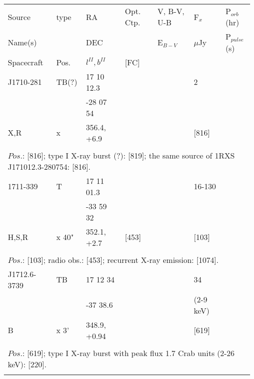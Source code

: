 \documentclass{aa}
\begin{document}
\begin{tabular}{p{2.5cm}p{1cm}p{1.8cm}p{2.3cm}p{3.3cm}p{2.0cm}p{2.2cm}}
\noalign{\smallskip}
\multicolumn{7}{p{17.5cm}}{Table 1.  (continued) }\\        
\hline
\noalign{\smallskip}
Source         & type  & RA                       &  Opt. Ctp. & V, B-V, U-B  & F$_{x}$          & P$_{orb}$(hr)    \\
Name(s)       &            & DEC                    &                     & E$_{B-V}$   & $\mu$Jy        & P$_{pulse}$(s) \\
Spacecraft & Pos.  & $l^{II}, b^{II}$      &  [FC]           &                        &                         &                             \\
\noalign{\smallskip} 
\hline

\noalign{\smallskip}
J1710-281       & TB(?)   & 17 10 12.3      &                     &                     & 2              &      \\
                          &               & -28 07 54        &                     &                     &                 &    \\
X,R                   & x            & 356.4, +6.9      &                     &                    & [816]       &    \\
\\
\multicolumn{7}{p{17.5cm}}{
$Pos$.: [816]; type I X-ray burst (?): [819]; the same source of 1RXS J171012.3-280754: [816].}\\
\noalign{\smallskip}
\hline

\noalign{\smallskip}
1711-339         & T                  & 17 11 01.3          &                         &                         & 16-130      &       \\
                          &                      & -33 59 32           &                          &                         &                   &      \\
H,S,R               & x 40"            & 352.1, +2.7        & [453]                &                         & [103]         &       \\
\\
\multicolumn{7}{p{17.5cm}}{
$Pos$.: [103]; radio obs.: [453]; recurrent X-ray emission: [1074].}\\
\noalign{\smallskip}
\hline

\noalign{\smallskip}
J1712.6-3739  & TB         & 17 12 34           &                    &                     & 34                 &      \\
                           &               & -37 38.6            &                     &                    & (2-9 keV)     &    \\
B                        & x 3'         & 348.9, +0.94     &                    &                     & [619]            &    \\
\\
\multicolumn{7}{p{17.5cm}}{
$Pos$.: [619]; type I X-ray burst with peak flux 1.7 Crab units (2-26 keV): [220].}\\
\noalign{\smallskip}
\hline


\end{tabular}
\end{document}
